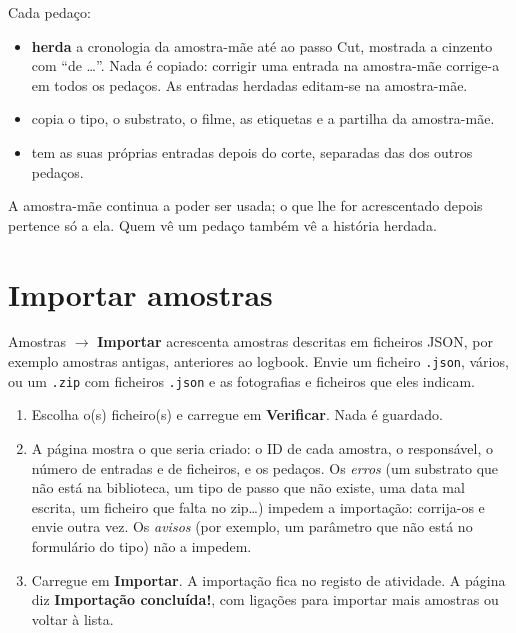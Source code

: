 \documentclass[11pt,a4paper]{article}
\newcommand{\ui}[1]{\textsf{\textbf{#1}}}
\newcommand{\menu}[1]{\textsf{#1}}
\begin{document}
Cada pedaço:
\begin{itemize}
  \item \textbf{herda} a cronologia da amostra-mãe até ao passo Cut,
        mostrada a cinzento com ``de \ldots''. Nada é copiado: corrigir
        uma entrada na amostra-mãe corrige-a em todos os pedaços. As
        entradas herdadas editam-se na amostra-mãe.
  \item copia o tipo, o substrato, o filme, as etiquetas e a partilha da
        amostra-mãe.
  \item tem as suas próprias entradas depois do corte, separadas das dos
        outros pedaços.
\end{itemize}

A amostra-mãe continua a poder ser usada; o que lhe for acrescentado
depois pertence só a ela. Quem vê um pedaço também vê a história herdada.

\section{Importar amostras}
\label{sec:import}

\menu{Amostras} $\rightarrow$ \ui{Importar} acrescenta amostras descritas em
ficheiros JSON, por exemplo amostras antigas, anteriores ao logbook. Envie um
ficheiro \texttt{.json}, vários, ou um \texttt{.zip} com ficheiros
\texttt{.json} e as fotografias e ficheiros que eles indicam.

\begin{enumerate}
  \item Escolha o(s) ficheiro(s) e carregue em \ui{Verificar}. Nada é guardado.
  \item A página mostra o que seria criado: o ID de cada amostra, o
        responsável, o número de entradas e de ficheiros, e os pedaços. Os
        \emph{erros} (um substrato que não está na biblioteca, um tipo de passo
        que não existe, uma data mal escrita, um ficheiro que falta no zip\ldots)
        impedem a importação: corrija-os e envie outra vez. Os \emph{avisos}
        (por exemplo, um parâmetro que não está no formulário do tipo) não a impedem.
  \item Carregue em \ui{Importar}. A importação fica no registo de atividade.
        A página diz \ui{Importação concluída!}, com ligações para importar mais
        amostras ou voltar à lista.
\end{enumerate}
\end{document}
